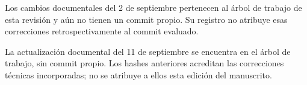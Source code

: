 Los cambios documentales del 2 de septiembre pertenecen al árbol de trabajo de esta revisión y aún no tienen un commit propio. Su registro no atribuye esas correcciones retrospectivamente al commit evaluado.

La actualización documental del 11 de septiembre se encuentra en el árbol de trabajo, sin commit propio. Los hashes anteriores acreditan las correcciones técnicas incorporadas; no se atribuye a ellos esta edición del manuscrito.
